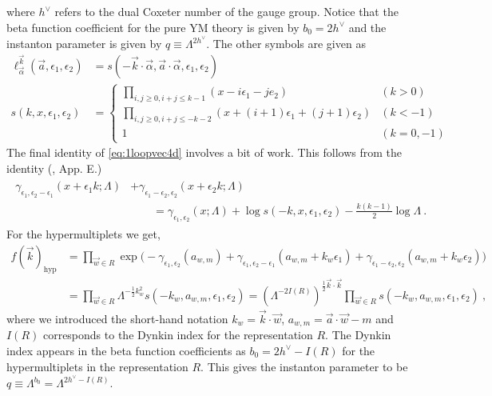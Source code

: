 \documentclass[letterpaper, 11pt]{article}
\newcommand{\nn}{\nonumber}
\def\a{\alpha}
\def\g{\gamma}
\def\e{\epsilon}
\def\half{\frac{1}{2}}
\begin{document}
where $h^\vee$ refers to the dual Coxeter number of the gauge group. Notice that the beta function coefficient for the pure YM theory is given by $b_0 = 2h^\vee$ and the instanton parameter is given by $q \equiv \Lambda^{2 h^\vee}$. The other symbols are given as 
\begin{align}
\ell^{\vec{k}}_{\vec{\alpha}} (\vec{a}, \e_1, \e_2) &= s(-\vec{k}\cdot\vec{\a}, \vec{a}\cdot\vec{\a}, \e_1, \e_2) \\
s(k, x, \e_1, \e_2) &= 
\begin{cases}
 {\displaystyle \prod_{i, j \ge 0, i+j \le k-1} (x - i \e_1 - j e_2) } & (k > 0) \\
 {\displaystyle \prod_{i, j \ge 0, i+j \le -k-2} (x + (i+1)\e_1 + (j+1)\e_2)} & (k < -1)  \\
 1 & (k=0, -1)
\end{cases}
\end{align}
The final identity of \eqref{eq:1loopvec4d} involves a bit of work. This follows from the identity (\cite{Nakajima:2003uh}, App. E.)
\begin{align}
\begin{split}
 \g_{\e_1, \e_2-\e_1}(x+\e_1 k; \Lambda) &+ \g_{\e_1 - \e_2, \e_2}(x+\e_2k; \Lambda) \\
  & \qquad = \g_{\e_1, \e_2}(x; \Lambda) + \log s(-k, x, \e_1, \e_2) - \frac{k(k-1)}{2} \log \Lambda \ . 
\end{split}
\end{align}
For the hypermultiplets we get, 
\begin{align}
f(\vec{k})_{\textrm{hyp}} &=  \prod_{\vec{w} \in R} \exp \Big( -\g_{\e_1, \e_2} (a_{w, m}) + \g_{\e_1, \e_2 - \e_1}(a_{w, m} + k_w \e_1) +  \g_{\e_1 - \e_2, \e_2 }(a_{w, m} + k_w \e_2)   \Big) \nn \\
&= \prod_{\vec{w} \in R} \Lambda^{-\half k_w^2} s(-{k}_w, a_{w, m}, \e_1, \e_2) 
= (\Lambda^{- 2 I(R)})^{\half \vec{k} \cdot \vec{k} }\prod_{\vec{w} \in R}  s(-{k}_w, a_{w, m}, \e_1, \e_2) 
\ , 
\end{align}
where we introduced the short-hand notation $k_w = \vec{k}\cdot\vec{w}$, $a_{w, m} = \vec{a} \cdot \vec{w} - m$ and $I(R)$ corresponds to the Dynkin index for the representation $R$. The Dynkin index appears in the beta function coefficients as $b_0 = 2h^\vee - I(R)$ for the hypermultiplets in the representation $R$.  This gives the instanton parameter to be $q \equiv \Lambda^{b_0} = \Lambda^{2h^\vee - I(R)}$. 
\end{document}
